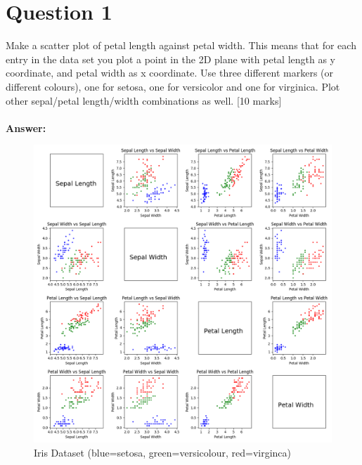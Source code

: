 \documentclass{article}
\begin{document}
\section{Question 1}
Make a scatter plot of petal length against petal width. This means that for each entry in the data set you plot a point in the 2D plane with petal length as y coordinate, and petal width as x coordinate. Use three different markers (or different colours), one for setosa, one for versicolor and one for virginica. Plot other sepal/petal length/width combinations as well.
[10 marks]\\\\
\textbf{Answer:}\\
\begin{figure}[H]
\centering
\includegraphics[scale=0.4]{iris.png}
\caption{Iris Dataset (blue=setosa, green=versicolour, red=virginca)}
\end{figure}
\end{document}
